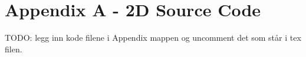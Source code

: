 \chapter{Appendix A - 2D Source Code}
TODO: legg inn kode filene i Appendix mappen og uncomment det som står i tex filen.
%
%
%